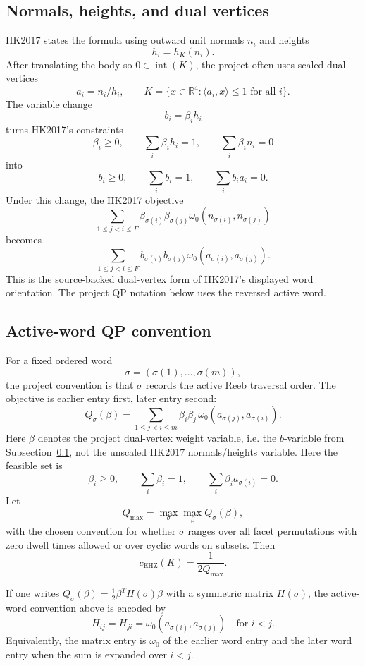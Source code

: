 \subsection{Normals, heights, and dual vertices}
\label{subsec:hk2017-normals-heights-dual-vertices}

HK2017 states the formula using outward unit normals \(n_i\) and heights
\[
  h_i = h_K(n_i).
\]
After translating the body so \(0\in\operatorname{int}(K)\), the project often
uses scaled dual vertices
\[
  a_i = n_i/h_i,
  \qquad
  K = \{x\in\mathbb{R}^4 : \langle a_i,x\rangle \leq 1
        \text{ for all }i\}.
\]
The variable change
\[
  b_i = \beta_i h_i
\]
turns HK2017's constraints
\[
  \beta_i\geq0,\qquad
  \sum_i\beta_i h_i=1,\qquad
  \sum_i\beta_i n_i=0
\]
into
\[
  b_i\geq0,\qquad
  \sum_i b_i=1,\qquad
  \sum_i b_i a_i=0.
\]
Under this change, the HK2017 objective
\[
  \sum_{1\leq j<i\leq F}
    \beta_{\sigma(i)}\beta_{\sigma(j)}
    \omega_0(n_{\sigma(i)},n_{\sigma(j)})
\]
becomes
\[
  \sum_{1\leq j<i\leq F}
    b_{\sigma(i)}b_{\sigma(j)}
    \omega_0(a_{\sigma(i)},a_{\sigma(j)}).
\]
This is the source-backed dual-vertex form of HK2017's displayed word
orientation.  The project QP notation below uses the reversed active word.

\subsection{Active-word QP convention}
\label{subsec:hk2017-active-word-qp-convention}

For a fixed ordered word
\[
  \sigma=(\sigma(1),\ldots,\sigma(m)),
\]
the project convention is that \(\sigma\) records the active Reeb traversal
order.  The objective is earlier entry first, later entry second:
\[
  Q_\sigma(\beta)
  =
  \sum_{1\leq j<i\leq m}
    \beta_i\beta_j\,
    \omega_0(a_{\sigma(j)},a_{\sigma(i)}).
\]
Here \(\beta\) denotes the project dual-vertex weight variable, i.e. the
\(b\)-variable from Subsection~\ref{subsec:hk2017-normals-heights-dual-vertices},
not the unscaled HK2017 normals/heights variable.
Here the feasible set is
\[
  \beta_i\geq0,\qquad
  \sum_i\beta_i=1,\qquad
  \sum_i\beta_i a_{\sigma(i)}=0.
\]
Let
\[
  Q_{\max}=\max_{\sigma}\max_{\beta} Q_\sigma(\beta),
\]
with the chosen convention for whether \(\sigma\) ranges over all facet
permutations with zero dwell times allowed or over cyclic words on subsets.
Then
\[
  c_{\mathrm{EHZ}}(K)=\frac{1}{2Q_{\max}}.
\]

If one writes \(Q_\sigma(\beta)=\frac12\beta^T H(\sigma)\beta\) with a
symmetric matrix \(H(\sigma)\), the active-word convention above is encoded by
\[
  H_{ij}=H_{ji}
  =
  \omega_0(a_{\sigma(i)},a_{\sigma(j)})
  \quad\text{for } i<j.
\]
Equivalently, the matrix entry is \(\omega_0\) of the earlier word entry and the
later word entry when the sum is expanded over \(i<j\).

